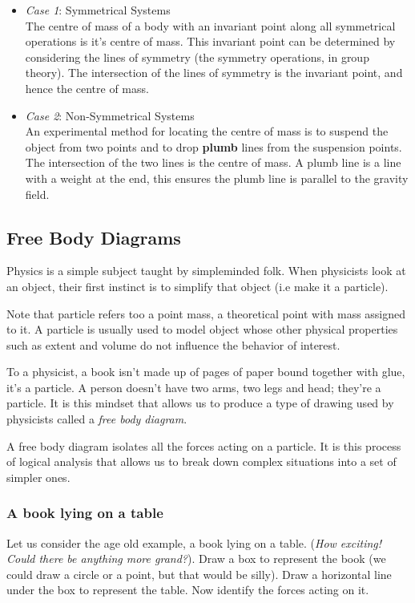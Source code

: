 \begin{itemize}
    \item \textit{Case 1}: Symmetrical Systems \\
    The centre of mass of a body with an invariant point along all symmetrical operations is it's centre of mass. This invariant point can be determined by considering the lines of symmetry (the symmetry operations, in group theory). The intersection of the lines of symmetry is the invariant point, and hence the centre of mass.
    \item \textit{Case 2}: Non-Symmetrical Systems \\
    An experimental method for locating the centre of mass is to suspend the object from two points and to drop \textbf{plumb} lines from the suspension points. The intersection of the two lines is the centre of mass. A plumb line is a line with a weight at the end, this ensures the plumb line is parallel to the gravity field.  
\end{itemize}

\subsection{Free Body Diagrams}

Physics is a simple subject taught by simpleminded folk. When physicists look at an object, their first instinct is to simplify that object (i.e make it a particle). 

Note that particle refers too a point mass, a theoretical point with mass assigned to it. A particle is usually used to model object whose other physical properties such as extent and volume do not influence the behavior of interest. 

To a physicist, a book isn't made up of pages of paper bound together with glue, it's a particle. A person doesn't have two arms, two legs and head; they're a particle. It is this mindset that allows us to produce a type of drawing used by physicists called a \textit{free body diagram}.

A free body diagram isolates all the forces acting on a particle. It is this process of logical analysis that allows us to break down complex situations into a set of simpler ones. 

\subsubsection{A book lying on a table}

Let us consider the age old example, a book lying on a table. (\textit{How exciting! Could there be anything more grand?}). Draw a box to represent the book (we could draw a circle or a point, but that would be silly). Draw a horizontal line under the box to represent the table. Now identify the forces acting on it. 

